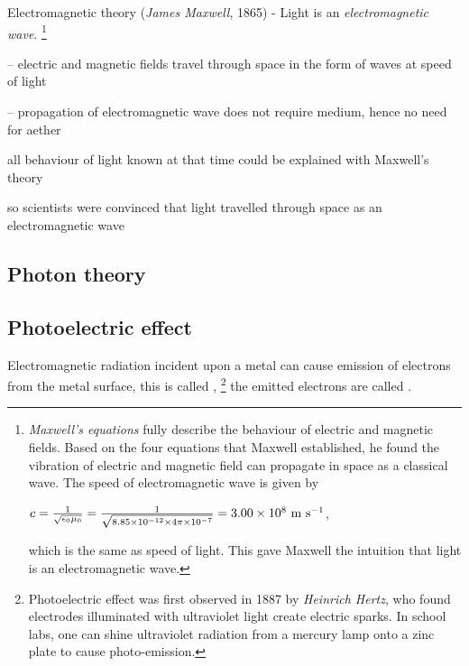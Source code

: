 Electromagnetic theory (\emph{James Maxwell}, 1865) - Light is an \emph{electromagnetic wave}.
\footnote{\emph{Maxwell's equations} fully describe the behaviour of electric and magnetic fields. Based on the four equations that Maxwell established, he found the vibration of electric and magnetic field can propagate in space as a classical wave. The speed of electromagnetic wave is given by
	
	{
		
		\centering
		
		$c=\frac{1}{\sqrt{\epsilon_0\mu_0}}=\frac{1}{\sqrt{8.85\times10^{-12}\times4\pi\times10^{-7}}} = 3.00 \times 10^8 \text{ m s$^{-1}$}$,
		
	}
	
	\noindent which is the same as speed of light. This gave Maxwell the intuition that light is an electromagnetic wave.}

\begin{compactitem}
	\item[--] electric and magnetic fields travel through space in the form of waves at speed of light
	
	\item[--] propagation of electromagnetic wave does not require medium, hence no need for aether
	
\end{compactitem}

all behaviour of light known at that time could be explained with Maxwell's theory

so scientists were convinced that light travelled through space as an electromagnetic wave


\subsection{Photon theory}


\subsection{Photoelectric effect}\label{ch-photoelectricity}

Electromagnetic radiation incident upon a metal can cause emission of electrons from the metal surface, this is called , 
\footnote{Photoelectric effect was first observed in 1887 by \emph{Heinrich Hertz}, who found electrodes illuminated with ultraviolet light create electric sparks. In school labs, one can shine ultraviolet radiation from a mercury lamp onto a zinc plate to cause photo-emission.} the emitted electrons are called .

